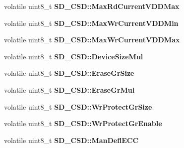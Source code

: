 \begin{DoxyCompactItemize}
\item 
volatile uint8\+\_\+t {\bfseries S\+D\+\_\+\+C\+S\+D\+::\+Max\+Rd\+Current\+V\+D\+D\+Max}\hypertarget{group__sd__card_ga234f8b4a3cfc3b7315f868b6db662c9d}{}\label{group__sd__card_ga234f8b4a3cfc3b7315f868b6db662c9d}

\item 
volatile uint8\+\_\+t {\bfseries S\+D\+\_\+\+C\+S\+D\+::\+Max\+Wr\+Current\+V\+D\+D\+Min}\hypertarget{group__sd__card_ga73ca31a038188d40d21a17bd8df2a537}{}\label{group__sd__card_ga73ca31a038188d40d21a17bd8df2a537}

\item 
volatile uint8\+\_\+t {\bfseries S\+D\+\_\+\+C\+S\+D\+::\+Max\+Wr\+Current\+V\+D\+D\+Max}\hypertarget{group__sd__card_ga5b8dc6523a12e769b3ae39414be1def9}{}\label{group__sd__card_ga5b8dc6523a12e769b3ae39414be1def9}

\item 
volatile uint8\+\_\+t {\bfseries S\+D\+\_\+\+C\+S\+D\+::\+Device\+Size\+Mul}\hypertarget{group__sd__card_gaca482f63045f066d6fb9ac446a5610d3}{}\label{group__sd__card_gaca482f63045f066d6fb9ac446a5610d3}

\item 
volatile uint8\+\_\+t {\bfseries S\+D\+\_\+\+C\+S\+D\+::\+Erase\+Gr\+Size}\hypertarget{group__sd__card_gabb7b59f21356b037b182c3821c965dab}{}\label{group__sd__card_gabb7b59f21356b037b182c3821c965dab}

\item 
volatile uint8\+\_\+t {\bfseries S\+D\+\_\+\+C\+S\+D\+::\+Erase\+Gr\+Mul}\hypertarget{group__sd__card_gab9143690c3d9259dce81738b55ceb9a0}{}\label{group__sd__card_gab9143690c3d9259dce81738b55ceb9a0}

\item 
volatile uint8\+\_\+t {\bfseries S\+D\+\_\+\+C\+S\+D\+::\+Wr\+Protect\+Gr\+Size}\hypertarget{group__sd__card_ga7e57d5b444f210a4309508f01711e8bd}{}\label{group__sd__card_ga7e57d5b444f210a4309508f01711e8bd}

\item 
volatile uint8\+\_\+t {\bfseries S\+D\+\_\+\+C\+S\+D\+::\+Wr\+Protect\+Gr\+Enable}\hypertarget{group__sd__card_ga1707098ad23967eec09ad50271182237}{}\label{group__sd__card_ga1707098ad23967eec09ad50271182237}

\item 
volatile uint8\+\_\+t {\bfseries S\+D\+\_\+\+C\+S\+D\+::\+Man\+Defl\+E\+CC}\hypertarget{group__sd__card_ga146f7fcc6a8f7d0171437bfca8620d03}{}\label{group__sd__card_ga146f7fcc6a8f7d0171437bfca8620d03}


\end{DoxyCompactItemize}

